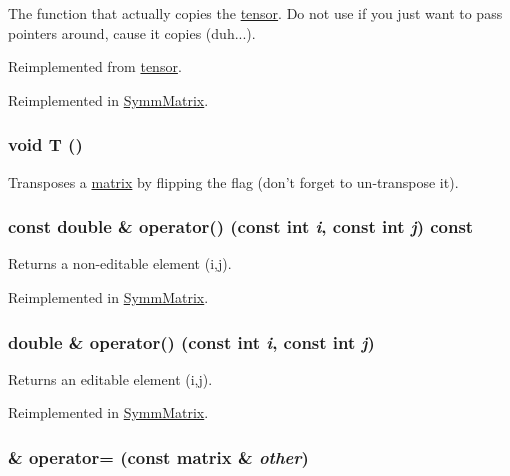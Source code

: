The function that actually copies the \hyperlink{classJKBuilder_1_1tensor}{tensor}. Do not use if you just want to pass pointers around, cause it copies (duh...). 

Reimplemented from \hyperlink{classJKBuilder_1_1tensor_a60e1f7417550ba45971b688cc168d34f}{tensor}.

Reimplemented in \hyperlink{classJKBuilder_1_1SymmMatrix_a7be0365900350f51e54969bb1961af8f}{SymmMatrix}.\hypertarget{classJKBuilder_1_1matrix_af2563817f6505e9f8a6ee5c5c209a115}{
\subsubsection[{T}]{\setlength{\rightskip}{0pt plus 5cm}void T ()}}
\label{classJKBuilder_1_1matrix_af2563817f6505e9f8a6ee5c5c209a115}


Transposes a \hyperlink{classJKBuilder_1_1matrix}{matrix} by flipping the flag (don't forget to un-\/transpose it). \hypertarget{classJKBuilder_1_1matrix_a9ccbac42f4eefb704f04886001f4fb3e}{
\subsubsection[{operator()}]{\setlength{\rightskip}{0pt plus 5cm}const double \& operator() (const int {\em i}, \/  const int {\em j}) const}}
\label{classJKBuilder_1_1matrix_a9ccbac42f4eefb704f04886001f4fb3e}


Returns a non-\/editable element (i,j). 

Reimplemented in \hyperlink{classJKBuilder_1_1SymmMatrix_a9ccbac42f4eefb704f04886001f4fb3e}{SymmMatrix}.\hypertarget{classJKBuilder_1_1matrix_a3d7fca183ff1c9f4c160218746f2ef31}{
\subsubsection[{operator()}]{\setlength{\rightskip}{0pt plus 5cm}double \& operator() (const int {\em i}, \/  const int {\em j})}}
\label{classJKBuilder_1_1matrix_a3d7fca183ff1c9f4c160218746f2ef31}


Returns an editable element (i,j). 

Reimplemented in \hyperlink{classJKBuilder_1_1SymmMatrix_a3d7fca183ff1c9f4c160218746f2ef31}{SymmMatrix}.\hypertarget{classJKBuilder_1_1matrix_a11df53cc3fc568369a9f612cfb556680}{
\subsubsection[{operator=}]{ \& operator= (const {\bf matrix} \& {\em other})}}
\label{classJKBuilder_1_1matrix_a11df53cc3fc568369a9f612cfb556680}


